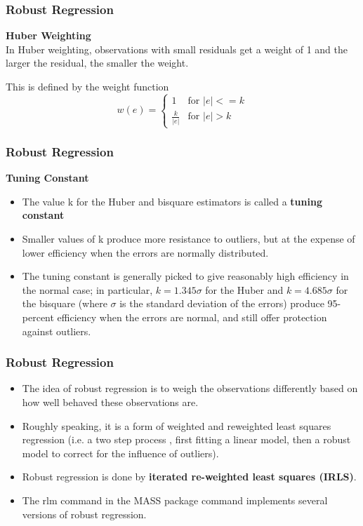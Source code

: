 \documentclass{beamer}
\begin{document}
	\begin{frame}
		\frametitle{Robust Regression}
		\large
		\noindent \textbf{Huber Weighting}\\
		In Huber weighting, observations with small residuals get a weight of 1 and the larger the residual, the smaller the weight. 
		
		\bigskip
		
		This is defined by the weight function \begin{equation} w(e) = \left\{ \begin{array}{rl} 1 &\mbox{for $|e| <= k$} \\ \frac{k}{|e|} &\mbox{for $|e| > k$} \end{array} \right. \end{equation}
	\end{frame}
	
	\begin{frame}

				\frametitle{Robust Regression}
				\large
				\noindent \textbf{Tuning Constant}
		\begin{itemize}		
\item 	The value k for the Huber and bisquare estimators is called a \textbf{tuning constant}
\item Smaller values of k produce
	more resistance to outliers, but at the expense of lower efficiency when the errors are normally distributed.
\item 	The tuning constant is generally picked to give reasonably high efficiency in the normal case; in particular,
	$k = 1.345\sigma$ for the Huber and $k = 4.685\sigma$ for the bisquare (where $\sigma$ is the standard deviation of the errors)
	produce 95-percent efficiency when the errors are normal, and still offer protection against outliers.
		\end{itemize}
	
	\end{frame}
\begin{frame}
	\frametitle{Robust Regression}
	\large
	\begin{itemize}
	\item The idea of robust regression is to weigh the observations differently based on how well behaved 
	these observations are. 
	\item Roughly speaking, it is a form of weighted and reweighted least squares 
	regression (i.e. a two step process , first fitting a linear model, then a robust model to correct for the 
	influence of outliers). 
	\item 
	Robust regression is done by\textbf{ iterated re-weighted least squares (IRLS)}.
	\item  The rlm command in the 
	MASS package command implements several versions of robust regression. 
	\end{itemize}
\end{frame}
\end{document}
